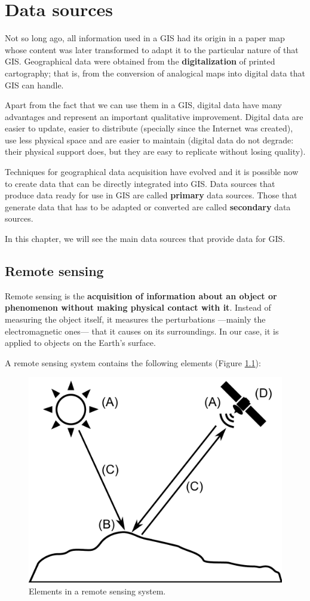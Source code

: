 
\chapter{Data sources}

\pagestyle{fancy}

Not so long ago, all information used in a GIS had its origin in a paper map whose content was later transformed to adapt it to the particular nature of that GIS. Geographical data were obtained from the \textbf{digitalization} of printed cartography; that is, from the conversion of analogical maps into digital data that GIS can handle.

Apart from the fact that we can use them in a GIS, digital data have many advantages and represent an important qualitative improvement. Digital data are easier to update, easier to distribute (specially since the Internet was created), use less physical space and are easier to maintain (digital data do not degrade: their physical support does, but they are easy to replicate without losing quality).

Techniques for geographical data acquisition have evolved and it is possible now to create data that can be directly integrated into GIS. Data sources that produce data ready for use in GIS are called \textbf{primary} data sources. Those that generate data that has to be adapted or converted are called \textbf{secondary} data sources.

In this chapter, we will see the main data sources that provide data for GIS.

\section{Remote sensing}

Remote sensing is the \textbf{acquisition of information about an object or phenomenon without making physical contact with it}. Instead of measuring the object itself, it measures the perturbations ---mainly the electromagnetic ones--- that it causes on its surroundings. In our case, it is applied to objects on the Earth's surface.

A remote sensing system contains the following elements (Figure \ref{Fig:Elements_remote_sensing}):

\begin{figure}[!hbt]   
\centering
\includegraphics[width=.6\textwidth]{Data_sources/Elements_remote_sensing.pdf}
\caption{\small Elements in a remote sensing system.}
\label{Fig:Elements_remote_sensing} 
\end{figure}


